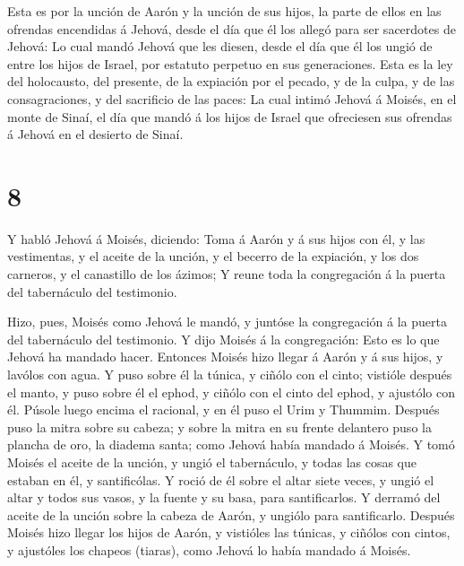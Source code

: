  Esta es por la unción de Aarón y la unción de sus hijos,
la parte de ellos en las ofrendas encendidas á Jehová, desde el día que
él los allegó para ser sacerdotes de Jehová:  Lo cual mandó
Jehová que les diesen, desde el día que él los ungió de entre los hijos
de Israel, por estatuto perpetuo en sus generaciones.  Esta
es la ley del holocausto, del presente, de la expiación por el pecado, y
de la culpa, y de las consagraciones, y del sacrificio de las paces:
 La cual intimó Jehová á Moisés, en el monte de Sinaí, el
día que mandó á los hijos de Israel que ofreciesen sus ofrendas á Jehová
en el desierto de Sinaí.

\hypertarget{section-7}{%
\section{8}\label{section-7}}

 Y habló Jehová á Moisés, diciendo:  Toma á
Aarón y á sus hijos con él, y las vestimentas, y el aceite de la unción,
y el becerro de la expiación, y los dos carneros, y el canastillo de los
ázimos;  Y reune toda la congregación á la puerta del
tabernáculo del testimonio.

 Hizo, pues, Moisés como Jehová le mandó, y juntóse la
congregación á la puerta del tabernáculo del testimonio.  Y
dijo Moisés á la congregación: Esto es lo que Jehová ha mandado hacer.
 Entonces Moisés hizo llegar á Aarón y á sus hijos, y
lavólos con agua.  Y puso sobre él la túnica, y ciñólo con
el cinto; vistióle después el manto, y puso sobre él el ephod, y ciñólo
con el cinto del ephod, y ajustólo con él.  Púsole luego
encima el racional, y en él puso el Urim y Thummim.  Después
puso la mitra sobre su cabeza; y sobre la mitra en su frente delantero
puso la plancha de oro, la diadema santa; como Jehová había mandado á
Moisés.  Y tomó Moisés el aceite de la unción, y ungió el
tabernáculo, y todas las cosas que estaban en él, y santificólas.
 Y roció de él sobre el altar siete veces, y ungió el altar
y todos sus vasos, y la fuente y su basa, para santificarlos.
 Y derramó del aceite de la unción sobre la cabeza de
Aarón, y ungiólo para santificarlo.  Después Moisés hizo
llegar los hijos de Aarón, y vistióles las túnicas, y ciñólos con
cintos, y ajustóles los chapeos (tiaras), como Jehová lo había mandado á
Moisés.

